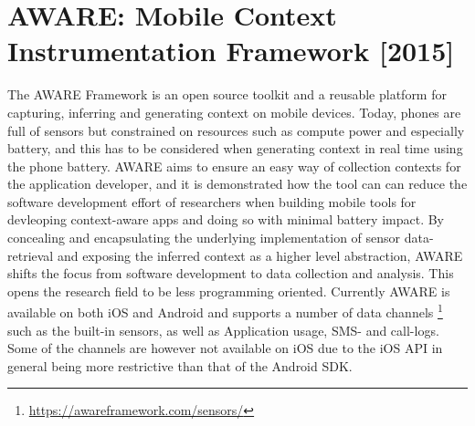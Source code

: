 \section{AWARE: Mobile Context Instrumentation Framework [2015]}
The AWARE Framework \cite{aware2015} is an open source toolkit and a reusable platform for capturing, inferring and generating context on mobile devices. Today, phones are full of sensors but constrained on resources such as compute power and especially battery, and this has to be considered when generating  context in real time using the phone battery. AWARE aims to ensure an easy way of collection contexts for the application developer, and it is demonstrated how the tool can can reduce the software development effort of researchers when building mobile tools for devleoping context-aware apps and doing so with minimal battery impact. By concealing and encapsulating the underlying implementation of sensor data-retrieval and exposing the inferred context as a higher level abstraction, AWARE shifts the focus from software development to data collection and analysis. This opens the research field to be less programming oriented. Currently AWARE is available on both iOS and Android and supports a number of data channels \footnote{\url{https://awareframework.com/sensors/}} such as the built-in sensors, as well as Application usage, SMS- and call-logs. Some of the channels are however not available on iOS due to the iOS API in general being more restrictive than that of the Android SDK.